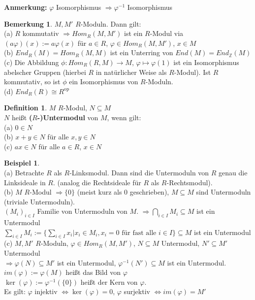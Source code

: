 \documentclass[10pt,a4paper,numbers=endperiod]{scrreprt}
\theoremstyle{definition}
\newtheorem{defi}[satz]{Definition}
\newtheorem{bem}[satz]{Bemerkung}
\newtheorem{bsp}[satz]{Beispiel}
\def\ZZ{{\mathbb Z}}
\begin{document}
\textbf{Anmerkung:} $\varphi$ Isomorphismus $\Rightarrow \varphi^{-1}$ Isomorphismus

\begin{bem}
	$M, M'$ $R$-Moduln. Dann gilt:\\
	(a) $R$ kommutativ $\Rightarrow Hom_R(M, M')$ ist ein $R$-Modul via $(a \varphi)(x) := a \varphi(x)$ für $a \in R$, $\varphi \in Hom_R(M, M')$, $x \in M$\\
	(b) $End_R(M) = Hom_R(M, M)$ ist ein Unterring von $End(M) = End_{\ZZ}(M)$\\
	(c) Die Abbildung $\phi: Hom_R(R,M) \rightarrow M$, $\varphi \mapsto \varphi(1)$ ist ein Isomorphismus abelscher Gruppen (hierbei $R$ in natürlicher Weise als $R$-Modul). Ist $R$ kommutativ, so ist $\phi$ ein Isomorphismus von $R$-Moduln.\\
	(d) $End_R(R) \cong R^{\text{op}}$
\end{bem}

\begin{defi}
	$M$ $R$-Modul, $N \subseteq M$\\
	$N$ heißt \textbf{($R$-)Untermodul} von $M$, wenn gilt:\\
	(a) $0 \in N$\\
	(b) $x+y \in N$ für alle $x, y \in N$\\
	(c) $ax \in N$ für alle $a\in R$, $x \in N$
\end{defi}

\begin{bsp}
	$ $\\
	(a) Betrachte $R$ als $R$-Linksmodul. Dann sind die Untermoduln von $R$ genau die Linksideale in $R$. (analog die Rechtsideale für $R$ als $R$-Rechtsmodul).\\
	(b) $M$ $R$-Modul $\Rightarrow \{0\}$ (meist kurz als 0 geschrieben), $M \subseteq M$ sind Untermoduln (triviale Untermoduln).\\
	\hspace{2mm} $(M_i)_{i \in I}$ Familie von Untermoduln von $M$. $\Rightarrow \bigcap\limits_{i \in I} M_i \subseteq M$ ist ein Untermodul\\
	\hspace{2 mm} $\sum\limits_{i \in I} M_i := \{ \sum\limits_{i \in I} x_i | x_i \in M_i, x_i = 0 \text{ für fast alle } i \in I\} \subseteq M$ ist ein Untermodul\\
	(c) $M, M'$ $R$-Moduln, $\varphi \in Hom_R(M, M')$, $N \subseteq M$ Untermodul, $N' \subseteq M'$ Untermodul\\
	$\Rightarrow \varphi(N) \subseteq M'$ ist ein Untermodul, $\varphi^{-1}(N') \subseteq M$ ist ein Untermodul.\\
	$im(\varphi) := \varphi(M)$ heißt das Bild von $\varphi$\\
	$\ker(\varphi) := \varphi^{-1}(\{0\})$ heißt der Kern von $\varphi$.\\
	Es gilt: $\varphi$ injektiv $\Leftrightarrow \ker(\varphi) = 0$, $\varphi$ surjektiv $\Leftrightarrow im(\varphi) = M'$
\end{bsp}
\end{document}
